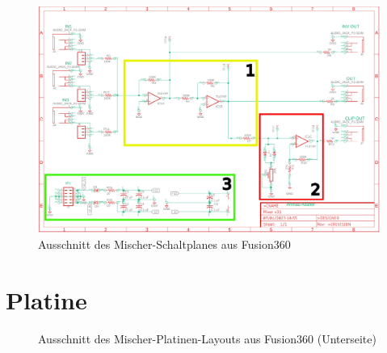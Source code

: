 \begin{figure}[h]
	\centering
	\includegraphics[angle=270, width=1\textwidth]{figures/SchaltplanMixer_new.png}
	\caption{Ausschnitt des Mischer-Schaltplanes aus Fusion360 \cite{mixer_manual}}
	\label{fig:schaltplan_mixer}
\end{figure}
\FloatBarrier

\section{Platine}
\begin{figure}[h]
	\centering
	\setlength{\fboxsep}{1pt} %
	\setlength{\fboxrule}{1pt} %
	\caption{Ausschnitt des Mischer-Platinen-Layouts aus Fusion360 (Unterseite)}
	\label{fig:platine_mixer}
\end{figure}
\FloatBarrier